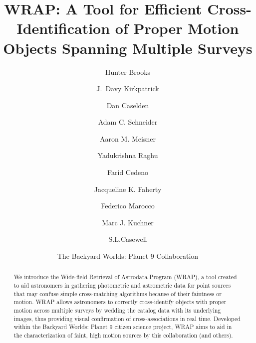 \documentclass[twocolumn]{aastex631}
\begin{document}
\title{WRAP: A Tool for Efficient Cross-Identification of Proper Motion Objects Spanning Multiple Surveys }

\author[0000-0002-5253-0383]{Hunter Brooks}

\author[0000-0003-4269-260X]{J.\ Davy Kirkpatrick}

\author[0000-0001-7896-5791]{Dan Caselden}

\author[0000-0002-6294-5937]{Adam C. Schneider}

\author[0000-0002-1125-7384]{Aaron M. Meisner}

\author[0000-0001-9778-7054]{Yadukrishna Raghu}

\author[0009-0009-1388-1541]{Farid Cedeno}

\author[0000-0001-6251-0573]{Jacqueline K. Faherty}

\author[0000-0001-7519-1700]{Federico Marocco}

\author[0000-0002-2387-5489]{Marc J. Kuchner}

\author[0000-0003-2478-0120]{S.L.Casewell}

\author{The Backyard Worlds:  Planet 9 Collaboration}

\begin{abstract}
We introduce the Wide-field Retrieval of Astrodata Program (WRAP), a tool created to aid astronomers in gathering photometric and astrometric data for point sources that may confuse simple cross-matching algorithms because of their faintness or motion. WRAP allows astronomers to correctly cross-identify objects with proper motion across multiple surveys by wedding the catalog data with its underlying images, thus providing visual confirmation of cross-associations in real time. Developed within the Backyard Worlds: Planet 9 citizen science project, WRAP aims to aid in the characterization of faint, high motion sources by this collaboration (and others).
\end{abstract}
\end{document}
